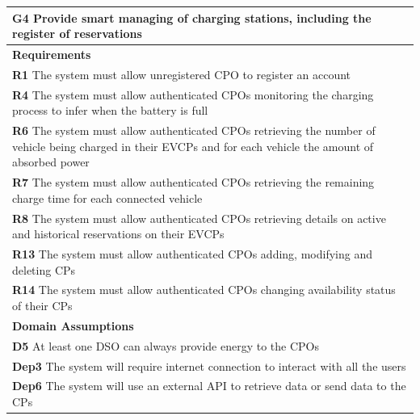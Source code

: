 \begin{table}[H]
    \begin{tabularx}{\textwidth}{X}
        \toprule
        \textbf{G4} Provide smart managing of charging stations, including the register of reservations                                                                       \\ \midrule
        \textbf{Requirements}                                                                                                                                                 \\ \midrule
        \textbf{R1}  The system must allow unregistered CPO to register an account                                                                                            \\
        \textbf{R4}  The system must allow authenticated CPOs monitoring the charging process to infer when the battery is full                                               \\
        \textbf{R6}  The system must allow authenticated CPOs retrieving the number of vehicle being charged in their EVCPs and for each vehicle the amount of absorbed power \\
        \textbf{R7}  The system must allow authenticated CPOs retrieving the remaining charge time for each connected vehicle                                                 \\
        \textbf{R8}  The system must allow authenticated CPOs retrieving details on active and historical reservations on their EVCPs                                         \\
        \textbf{R13} The system must allow authenticated CPOs adding, modifying and deleting CPs                                                                              \\
        \textbf{R14} The system must allow authenticated CPOs changing availability status of their CPs                                                                       \\ \midrule
        \textbf{Domain Assumptions}                                                                                                                                           \\ \midrule
        \textbf{D5}    At least one DSO can always provide energy to the CPOs                                                                                                 \\
        \textbf{Dep3}  The system will require internet connection to interact with all the users                                                                             \\
        \textbf{Dep6}  The system will use an external API to retrieve data or send data to the CPs                                                                           \\ \bottomrule
    \end{tabularx}
\end{table}
